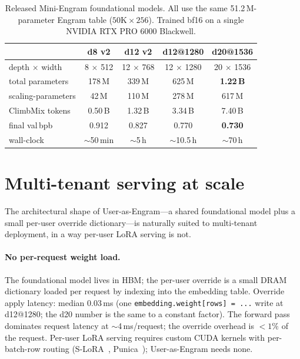 \documentclass{article}
\begin{document}
\begin{table}[t]
  \centering
  \caption{Released Mini-Engram foundational models. All use the same
  51.2\,M-parameter Engram table ($50\text{K}\!\times\!256$). Trained
  bf16 on a single NVIDIA RTX PRO 6000 Blackwell.}
  \label{tab:miniengram}
  \begin{tabular}{lcccc}
    \toprule
     & d8 v2 & d12 v2 & \textbf{d12@1280} & \textbf{d20@1536} \\
    \midrule
    depth $\times$ width    & 8 $\times$ 512  & 12 $\times$ 768 & 12 $\times$ 1280 & 20 $\times$ 1536 \\
    total parameters        & 178\,M          & 339\,M          & 625\,M           & \textbf{1.22\,B} \\
    scaling-parameters      & 42\,M           & 110\,M          & 278\,M           & 617\,M \\
    ClimbMix tokens         & 0.50\,B         & 1.32\,B         & 3.34\,B          & 7.40\,B \\
    final val\,bpb          & 0.912           & 0.827           & 0.770            & \textbf{0.730} \\
    wall-clock              & $\sim$50\,min   & $\sim$5\,h      & $\sim$10.5\,h    & $\sim$70\,h \\
    \bottomrule
  \end{tabular}
\end{table}


\section{Multi-tenant serving at scale}
\label{sec:serving}

The architectural shape of User-as-Engram—a shared foundational model
plus a small per-user override dictionary—is naturally suited to
multi-tenant deployment, in a way per-user LoRA serving is not.

\paragraph{No per-request weight load.}
The foundational model lives in HBM; the per-user override is a small
DRAM dictionary loaded per request by indexing into the embedding
table. Override apply latency: median 0.03\,ms (one
\texttt{embedding.weight[rows] = ...} write at d12@1280; the d20
number is the same to a constant factor). The forward pass dominates
request latency at $\sim$4\,ms/request; the override overhead is
$<1\%$ of the request. Per-user LoRA serving requires custom CUDA
kernels with per-batch-row routing (S-LoRA~\citep{sheng2024slora},
Punica~\citep{chen2024punica}); User-as-Engram needs none.
\end{document}
